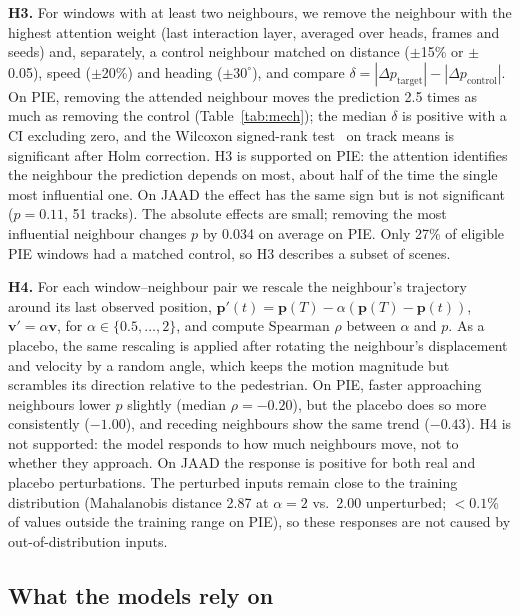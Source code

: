 \documentclass[conference]{IEEEtran}
\begin{document}
\textbf{H3.} For windows with at least two neighbours, we remove the neighbour with the highest attention weight (last interaction layer, averaged over heads, frames and seeds) and, separately, a control neighbour matched on distance ($\pm$15\% or $\pm$0.05), speed ($\pm$20\%) and heading ($\pm30^\circ$), and compare $\delta = |\Delta p_{\text{target}}| - |\Delta p_{\text{control}}|$. On PIE, removing the attended neighbour moves the prediction 2.5 times as much as removing the control (Table~\ref{tab:mech}); the median $\delta$ is positive with a CI excluding zero, and the Wilcoxon signed-rank test~\cite{wilcoxon1945} on track means is significant after Holm correction. H3 is supported on PIE: the attention identifies the neighbour the prediction depends on most, about half of the time the single most influential one. On JAAD the effect has the same sign but is not significant ($p=0.11$, 51 tracks). The absolute effects are small; removing the most influential neighbour changes $p$ by 0.034 on average on PIE. Only 27\% of eligible PIE windows had a matched control, so H3 describes a subset of scenes.

\textbf{H4.} For each window--neighbour pair we rescale the neighbour's trajectory around its last observed position, $\mathbf{p}'(t)=\mathbf{p}(T)-\alpha(\mathbf{p}(T)-\mathbf{p}(t))$, $\mathbf{v}'=\alpha\mathbf{v}$, for $\alpha\in\{0.5,\dots,2\}$, and compute Spearman $\rho$ between $\alpha$ and $p$. As a placebo, the same rescaling is applied after rotating the neighbour's displacement and velocity by a random angle, which keeps the motion magnitude but scrambles its direction relative to the pedestrian. On PIE, faster approaching neighbours lower $p$ slightly (median $\rho=-0.20$), but the placebo does so more consistently ($-1.00$), and receding neighbours show the same trend ($-0.43$). H4 is not supported: the model responds to how much neighbours move, not to whether they approach. On JAAD the response is positive for both real and placebo perturbations. The perturbed inputs remain close to the training distribution (Mahalanobis distance 2.87 at $\alpha=2$ vs.\ 2.00 unperturbed; $<0.1$\% of values outside the training range on PIE), so these responses are not caused by out-of-distribution inputs.

\subsection{What the models rely on}\label{sec:base}
\end{document}
